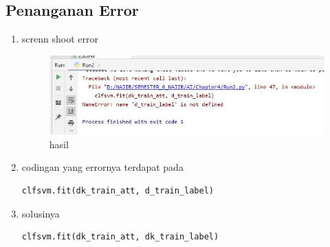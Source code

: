 \subsection{Penanganan Error}
\begin{enumerate}
\item screnn shoot error

\begin{figure}[ht]
\centering
\includegraphics[scale=0.5]{figures/1174042/chapter4/3,1.JPG}
\caption{hasil}
\label{Error}
\end{figure}

\item codingan yang errornya terdapat pada 
\begin{verbatim}
clfsvm.fit(dk_train_att, d_train_label)
\end{verbatim}
\item solusinya
\begin{verbatim}
clfsvm.fit(dk_train_att, dk_train_label)
\end{verbatim}
\end{enumerate}